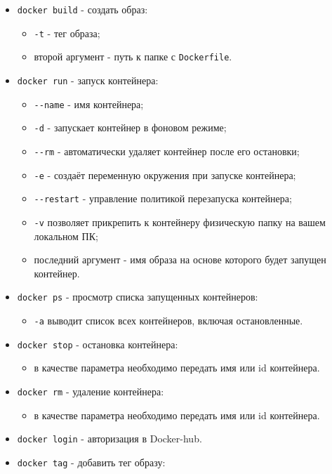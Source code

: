 \documentclass[
]{book}
\providecommand{\tightlist}{%
  \setlength{\itemsep}{0pt}\setlength{\parskip}{0pt}}
\begin{document}
\begin{itemize}
\tightlist
\item
  \texttt{docker\ build} - создать образ:

  \begin{itemize}
  \tightlist
  \item
    \texttt{-t} - тег образа;
  \item
    второй аргумент - путь к папке с \texttt{Dockerfile}.
  \end{itemize}
\item
  \texttt{docker\ run} - запуск контейнера:

  \begin{itemize}
  \tightlist
  \item
    \texttt{-\/-name} - имя контейнера;
  \item
    \texttt{-d} - запускает контейнер в фоновом режиме;
  \item
    \texttt{-\/-rm} - автоматически удаляет контейнер после его остановки;
  \item
    \texttt{-e} - создаёт переменную окружения при запуске контейнера;
  \item
    \texttt{-\/-restart} - управление политикой перезапуска контейнера;
  \item
    \texttt{-v} позволяет прикрепить к контейнеру физическую папку на вашем локальном ПК;
  \item
    последний аргумент - имя образа на основе которого будет запущен контейнер.
  \end{itemize}
\item
  \texttt{docker\ ps} - просмотр списка запущенных контейнеров:

  \begin{itemize}
  \tightlist
  \item
    \texttt{-a} выводит список всех контейнеров, включая остановленные.
  \end{itemize}
\item
  \texttt{docker\ stop} - остановка контейнера:

  \begin{itemize}
  \tightlist
  \item
    в качестве параметра необходимо передать имя или id контейнера.
  \end{itemize}
\item
  \texttt{docker\ rm} - удаление контейнера:

  \begin{itemize}
  \tightlist
  \item
    в качестве параметра необходимо передать имя или id контейнера.
  \end{itemize}
\item
  \texttt{docker\ login} - авторизация в Docker-hub.
\item
  \texttt{docker\ tag} - добавить тег образу:


\end{itemize}
\end{document}
